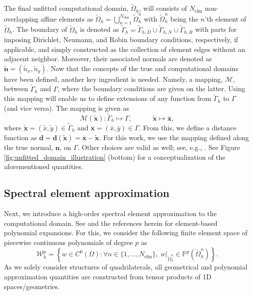 \documentclass{article}
\begin{document}
The final unfitted computational domain, $\tilde{\Omega}_h$, will consists of $N_{\text{elm}}$ non-overlapping affine elements as $ \tilde{\Omega}_h  = \bigcup_{n=1}^{N_{\text{elm}}} \tilde{\Omega}^n_h$ with $\tilde{\Omega}^n_h$ being the $n$'th element of $\tilde{\Omega}_h$. The boundary of $\tilde{\Omega}_h$ is denoted as $\tilde{\Gamma}_h = \tilde{\Gamma}_{h,D} \cup \tilde{\Gamma}_{h,N} \cup \tilde{\Gamma}_{h,R}$ with parts for imposing Dirichlet, Neumann, and Robin boundary conditions, respectively, if applicable, and simply constructed as the collection of element edges without an adjacent neighbor. Moreover, their associated normals are denoted as $\tilde{\boldsymbol{n}} = (\tilde{n}_x,\tilde{n}_y)$. Now that the concepts of the true and computational domains have been defined, another key ingredient is needed. Namely, a mapping, $\mathcal{M}$, between $\tilde{\Gamma}_h$ and $\Gamma$, where the boundary conditions are given on the latter. Using this mapping will enable us to define extensions of any function from $\tilde{\Gamma}_h$ to $\Gamma$ (and vice versa). The mapping is given as
\begin{equation}\label{eq:mapping}
     \mathcal{M}(\tilde{\boldsymbol{x}}): \tilde{\Gamma}_h \mapsto \Gamma, \quad \quad \quad \tilde{\boldsymbol{x}} \mapsto \bar{\boldsymbol{x}},
\end{equation}
where $\tilde{\boldsymbol{x}} = (\tilde{x},\tilde{y}) \in \tilde{\Gamma}_h$ and $\bar{\boldsymbol{x}} = (\bar{x},\bar{y}) \in \Gamma$. From this, we define a distance function as $\boldsymbol{d} = \boldsymbol{d}(\tilde{\boldsymbol{x}}) =\bar{\boldsymbol{x}} - \tilde{\boldsymbol{x}}$. For this work, we use the mapping defined along the true normal, $\boldsymbol{n}$, on $\Gamma$. Other choices are valid as well; see, e.g., \cite{visbech2025spectral}. See Figure \ref{fig:unfitted_domain_illustration} (bottom) for a conceptualization of the aforementioned quantities.



\subsection{Spectral element approximation}\label{sec:SEM}

Next, we introduce a high-order spectral element approximation to the computational domain. See \cite{karniadakis2005spectral,hesthaven2008nodal} and the references herein for element-based polynomial expansions. For this, we consider the following finite element space of piecewise continuous polynomials of degree $p$ as
\begin{equation}\label{eq:Wp}
\mathcal{W}_h^p = \left\{ w \in C^0(\Omega) : \forall n \in \{1,\ldots,N_{\text{elm}}\},\; w|_{\tilde{\Omega}^n_h} \in \mathbb{P}^p(\tilde{\Omega}^n_h) \right\}.
\end{equation}
As we solely consider structures of quadrilaterals, all geometrical and polynomial approximation quantities are constructed from tensor products of 1D spaces/geometries.
\end{document}
